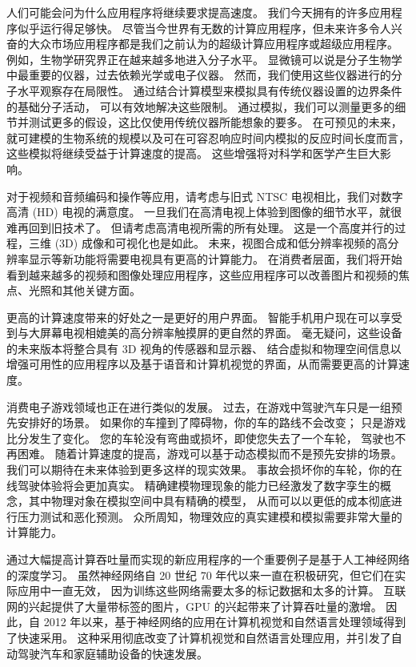 人们可能会问为什么应用程序将继续要求提高速度。 我们今天拥有的许多应用程序似乎运行得足够快。 
尽管当今世界有无数的计算应用程序，但未来许多令人兴奋的大众市场应用程序都是我们之前认为的超级计算应用程序或超级应用程序。 
例如，生物学研究界正在越来越多地进入分子水平。 显微镜可以说是分子生物学中最重要的仪器，过去依赖光学或电子仪器。 
然而，我们使用这些仪器进行的分子水平观察存在局限性。 通过结合计算模型来模拟具有传统仪器设置的边界条件的基础分子活动，
可以有效地解决这些限制。 通过模拟，我们可以测量更多的细节并测试更多的假设，这比仅使用传统仪器所能想象的要多。 
在可预见的未来，就可建模的生物系统的规模以及可在可容忍响应时间内模拟的反应时间长度而言，这些模拟将继续受益于计算速度的提高。 
这些增强将对科学和医学产生巨大影响。

对于视频和音频编码和操作等应用，请考虑与旧式 NTSC 电视相比，我们对数字高清 (HD) 电视的满意度。 
一旦我们在高清电视上体验到图像的细节水平，就很难再回到旧技术了。 但请考虑高清电视所需的所有处理。 
这是一个高度并行的过程，三维 (3D) 成像和可视化也是如此。 
未来，视图合成和低分辨率视频的高分辨率显示等新功能将需要电视具有更高的计算能力。 
在消费者层面，我们将开始看到越来越多的视频和图像处理应用程序，这些应用程序可以改善图片和视频的焦点、光照和其他关键方面。

更高的计算速度带来的好处之一是更好的用户界面。 智能手机用户现在可以享受到与大屏幕电视相媲美的高分辨率触摸屏的更自然的界面。 
毫无疑问，这些设备的未来版本将整合具有 3D 视角的传感器和显示器、
结合虚拟和物理空间信息以增强可用性的应用程序以及基于语音和计算机视觉的界面，从而需要更高的计算速度。

消费电子游戏领域也正在进行类似的发展。 过去，在游戏中驾驶汽车只是一组预先安排好的场景。 
如果你的车撞到了障碍物，你的车的路线不会改变； 只是游戏比分发生了变化。 您的车轮没有弯曲或损坏，即使您失去了一个车轮，
驾驶也不再困难。 随着计算速度的提高，游戏可以基于动态模拟而不是预先安排的场景。 
我们可以期待在未来体验到更多这样的现实效果。 事故会损坏你的车轮，你的在线驾驶体验将会更加真实。 
精确建模物理现象的能力已经激发了数字孪生的概念，其中物理对象在模拟空间中具有精确的模型，
从而可以以更低的成本彻底进行压力测试和恶化预测。 众所周知，物理效应的真实建模和模拟需要非常大量的计算能力。

通过大幅提高计算吞吐量而实现的新应用程序的一个重要例子是基于人工神经网络的深度学习。 
虽然神经网络自 20 世纪 70 年代以来一直在积极研究，但它们在实际应用中一直无效，
因为训练这些网络需要太多的标记数据和太多的计算。 互联网的兴起提供了大量带标签的图片，GPU 的兴起带来了计算吞吐量的激增。 
因此，自 2012 年以来，基于神经网络的应用在计算机视觉和自然语言处理领域得到了快速采用。
这种采用彻底改变了计算机视觉和自然语言处理应用，并引发了自动驾驶汽车和家庭辅助设备的快速发展。


